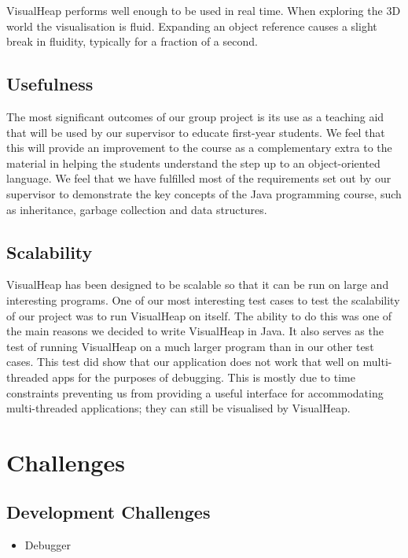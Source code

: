 \documentclass[11pt, a4paper]{report}
\begin{document}
VisualHeap performs well enough to be used in real time. When exploring the 3D world the visualisation is fluid. Expanding an object reference causes a slight break in fluidity, typically for a fraction of a second.

\section{Usefulness}

The most significant outcomes of our group project is its use as a teaching aid that will be used by our supervisor to educate first-year students. We feel that this will provide an improvement to the course as a complementary extra to the material in helping the students understand the step up to an object-oriented language. We feel that we have fulfilled most of the requirements set out by our supervisor to demonstrate the key concepts of the Java programming course, such as inheritance, garbage collection and data structures.

\section{Scalability}

VisualHeap has been designed to be scalable so that it can be run on large and interesting programs. One of our most interesting test cases to test the scalability of our project was to run VisualHeap on itself. The ability to do this was one of the main reasons we decided to write VisualHeap in Java. It also serves as the test of running VisualHeap on a much larger program than in our other test cases. This test did show that our application does not work that well on multi-threaded apps for the purposes of debugging. This is mostly due to time constraints preventing us from providing a useful interface for accommodating multi-threaded applications; they can still be visualised by VisualHeap.

\chapter{Challenges}

\section{Development Challenges}

\begin{itemize}
  \item Debugger
\end{itemize}
\end{document}
